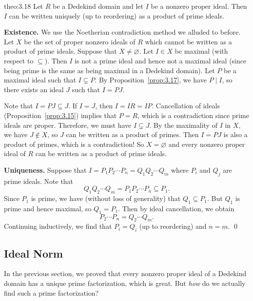 \begin{theo}{theo:3.18}
    Let $R$ be a Dedekind domain and let $I$ be a nonzero proper ideal. 
    Then $I$ can be written uniquely (up to reordering) as a product 
    of prime ideals. 
\end{theo}\vspace{-0.25cm}
\begin{pf}
    {\bf Existence.} We use the Noetherian contradiction method 
    we alluded to before. Let $X$ be the set of proper nonzero ideals of $R$ 
    which cannot be written as a product of prime ideals. Suppose that 
    $X \neq \varnothing$. Let $I \in X$ be maximal (with respect to 
    $\subseteq$). Then $I$ is not a prime ideal and hence not a maximal ideal 
    (since being prime is the same as being maximal in a Dedekind domain).
    Let $P$ be a maximal ideal such that $I \subsetneq P$. By 
    Proposition~\ref{prop:3.17}, we have $P \mid I$, so there exists an ideal 
    $J$ such that $I = PJ$.

    Note that $I = PJ \subseteq J$. If $I = J$, then $I = IR = IP$.
    Cancellation of ideals (Proposition~\ref{prop:3.15}) implies that 
    $P = R$, which is a contradiction since prime ideals are proper. Therefore, 
    we must have $I \subsetneq J$. 
    By the maximality of $I$ in $X$, we have $J \notin X$, so $J$ 
    can be written as a product of primes. Then $I = PJ$ is also a product 
    of primes, which is a contradiction! So $X = \varnothing$ and 
    every nonzero proper ideal of $R$ can be written as a product of 
    prime ideals.

    {\bf Uniqueness.} Suppose that $I = P_1P_2 \cdots P_n = Q_1Q_2 \cdots Q_m$ 
    where $P_i$ and $Q_j$ are prime ideals. Note that 
    \[ Q_1 Q_2 \cdots Q_m = P_1 P_2 \cdots P_n \subseteq P_1. \] \newpage
    Since $P_1$ is prime, we have (without loss of generality) that 
    $Q_1 \subseteq P_1$. But $Q_1$ is prime and hence maximal, so 
    $Q_1 = P_1$. Then by ideal cancellation, we obtain 
    \[ P_2 \cdots P_n = Q_2 \cdots Q_m. \] 
    Continuing inductively, we find that $P_i = Q_i$ (up to reordering) 
    and $n = m$. \qed 
\end{pf}

\subsection{Ideal Norm} \label{subsec:3.4}
In the previous section, we proved that every nonzero proper ideal of a 
Dedekind domain has a unique prime factorization, which is great. 
But \emph{how} do we actually find such a prime factorization?

